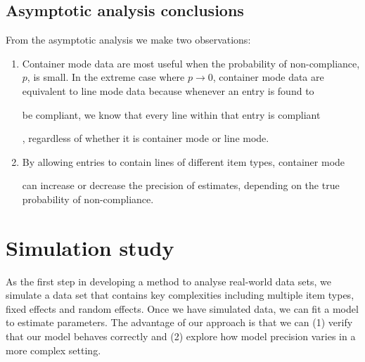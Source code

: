 \documentclass{article}
\newif\ifproofread
\newcommand{\rev}[1]{%
\ifproofread
\hl{#1}%
\else
#1%
\fi
}
\begin{document}
%
%
%
%


\subsection{Asymptotic analysis conclusions}

From the asymptotic analysis we make two observations:
\begin{enumerate}
\item Container mode data are most useful when the probability of non-compliance, \(p\), is small. In the extreme case where \(p\rightarrow 0\), container mode data are equivalent to line mode data because whenever an entry is found to \rev{be compliant, we know that every line within that entry is compliant}, regardless of whether it is container mode or line mode. 
\item \rev{By allowing entries to contain lines of different item types, container mode} can increase or decrease the precision of estimates, depending on the true probability of non-compliance.
\end{enumerate}


\section{Simulation study}
As the first step in developing a method to analyse real-world data sets, we simulate a data set that contains key complexities including multiple item types, fixed effects and random effects. Once we have simulated data, we can fit a model to estimate parameters. The advantage of our approach is that we can (1) verify that our model behaves correctly and (2) explore how model precision varies in a more complex setting.
\end{document}
